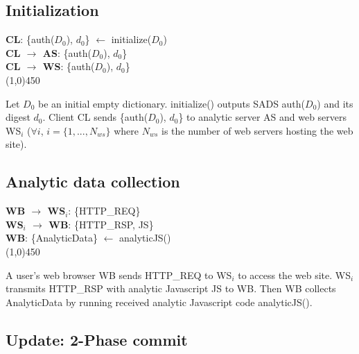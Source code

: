 \subsection{Initialization}

\begin{framed}
\noindent
\textbf{CL}: \textsf{ \{auth($D_0$), $d_0$\} $\leftarrow$ initialize($D_0$)}	\\
\textbf{CL $\rightarrow$ AS}: \textsf{ \{auth($D_0$), $d_0$\} } 	\\
\textbf{CL $\rightarrow$ WS}: \textsf{ \{auth($D_0$), $d_0$\} } 	\\
\line(1,0){450}

\noindent
Let $D_0$ be an initial empty dictionary.  \textsf{initialize()} outputs SADS \textsf{auth($D_0$)} and its digest \textsf{$d_0$}.
Client \textsf{CL} sends \textsf{\{auth($D_0$), $d_0$\}} to analytic server \textsf{AS} and web servers \textsf{WS$_i$} ($\forall i$, $i = \{1,...,N_{ws}\}$ where $N_{ws}$ is the number of web servers hosting the web site). 
\end{framed}


\subsection{Analytic data collection}
\begin{framed}
\noindent
\textbf{WB $\rightarrow$ WS$_i$}: \textsf{\{HTTP\_REQ\}}	\\
\textbf{WS$_i$ $\rightarrow$ WB}: \textsf{\{HTTP\_RSP, JS\}}	\\
\textbf{WB}: \textsf{\{AnalyticData\} $\leftarrow$ analyticJS()}	\\
\line(1,0){450}

\noindent
A user's web browser \textsf{WB} sends \textsf{HTTP\_REQ} to \textsf{WS$_i$} to access the web site.
\textsf{WS$_i$} transmits \textsf{HTTP\_RSP} with analytic Javascript \textsf{JS} to \textsf{WB}.
Then \textsf{WB} collects \textsf{AnalyticData} by running received analytic Javascript code \textsf{analyticJS()}.
\end{framed}


\subsection{Update: 2-Phase commit}
\label{label:2phase_commit}

